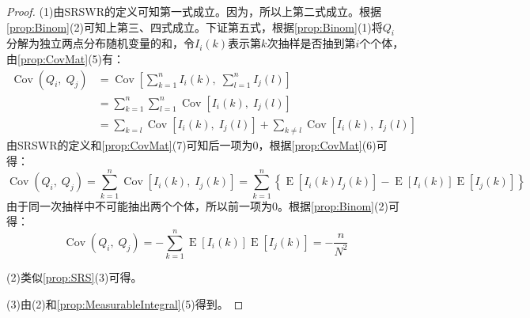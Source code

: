 \begin{proof} 
	(1)由SRSWR的定义可知第一式成立。因为，所以上第二式成立。根据\cref{prop:Binom}(2)可知上第三、四式成立。下证第五式，根据\cref{prop:Binom}(1)将$Q_i$分解为独立两点分布随机变量的和，令$I_i(k)$表示第$k$次抽样是否抽到第$i$个个体，由\cref{prop:CovMat}(5)有：
	\begin{align*}
		\operatorname{Cov}(Q_i,\;Q_j)&=\operatorname{Cov}\left[\sum_{k=1}^nI_i(k),\;\sum_{l=1}^nI_j(l)\right] \\
		&=\sum_{k=1}^n\sum_{l=1}^n\operatorname{Cov}[I_i(k),\;I_j(l)] \\
		&=\sum_{k=l}\operatorname{Cov}[I_i(k),\;I_j(l)]+\sum_{k\ne l}\operatorname{Cov}[I_i(k),\;I_j(l)]
	\end{align*}
	由SRSWR的定义和\cref{prop:CovMat}(7)可知后一项为$0$，根据\cref{prop:CovMat}(6)可得：
	\begin{equation*}
		\operatorname{Cov}(Q_i,\;Q_j)
		=\sum_{k=1}^n\operatorname{Cov}[I_i(k),\;I_j(k)] =\sum_{k=1}^n\left\{\operatorname{E}[I_i(k)I_j(k)]-\operatorname{E}[I_i(k)]\operatorname{E}[I_j(k)]\right\}
	\end{equation*}
	由于同一次抽样中不可能抽出两个个体，所以前一项为$0$。根据\cref{prop:Binom}(2)可得：
	\begin{equation*}
		\operatorname{Cov}(Q_i,\;Q_j)
		=-\sum_{k=1}^n\operatorname{E}[I_i(k)]\operatorname{E}[I_j(k)]
		=-\frac{n}{N^2}
	\end{equation*}\par
	(2)类似\cref{prop:SRS}(3)可得。\par
	(3)由(2)和\cref{prop:MeasurableIntegral}(5)得到。
\end{proof}

